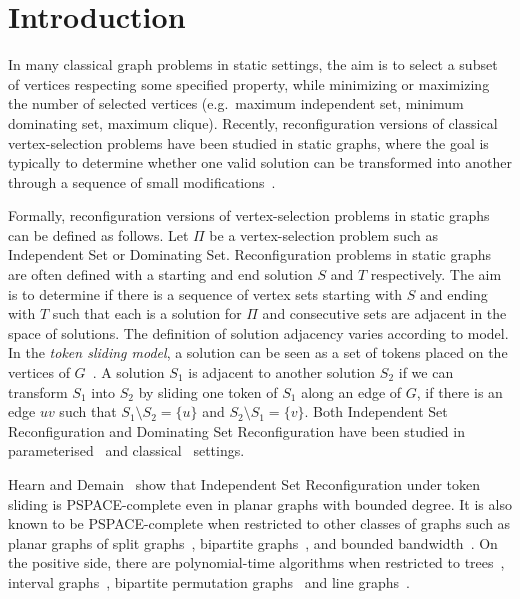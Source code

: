 \section{Introduction}

In many classical graph problems in static settings, the aim is to select a subset of vertices respecting some specified property, while minimizing or maximizing the number of selected vertices (e.g.\ maximum independent set, minimum dominating set, maximum clique).
%
Recently, reconfiguration versions of classical vertex-selection problems have been studied in static graphs, where the goal is typically to determine whether one valid solution can be transformed into another through a sequence of small modifications~\cite{BousquetMNS24,MouawadN0SS17}.

Formally, reconfiguration versions of vertex-selection problems in static graphs can be defined as follows. Let $\Pi$ be a vertex-selection problem such as {\sc Independent Set} or {\sc Dominating Set}. Reconfiguration problems in static graphs are often defined with a starting and end solution $S$ and $T$ respectively. The aim is to determine if there is a sequence of vertex sets starting with $S$ and ending with $T$ such that each is a solution for $\Pi$ and consecutive sets are adjacent in the space of solutions. The definition of solution adjacency varies according to model. In the \emph{token sliding model}, a solution can be seen as a set of tokens placed on the vertices of $G$~\cite{HEARN200572}. A solution $S_1$ is adjacent to another solution $S_2$ if we can transform $S_1$ into $S_2$ by sliding one token of $S_1$ along an edge of $G$, if there is an edge $uv$ such that $S_1 \setminus S_2 = \{u\}$ and $S_2 \setminus S_1 = \{v\}$. Both {\sc Independent Set Reconfiguration} and {\sc Dominating Set Reconfiguration} have been studied in parameterised~\cite{BodlaenderGS21,BartierBDLM21} and classical~\cite{BousquetJO20,SuzukiMN16} settings. 

Hearn and Demain~\cite{HEARN200572} show that {\sc Independent Set Reconfiguration} under token sliding is PSPACE-complete even in planar graphs with bounded degree. It is also known to be PSPACE-complete when restricted to other classes of graphs such as planar graphs of split graphs~\cite{BelmonteKLMOS21}, bipartite graphs~\cite{LokshtanovM19}, and bounded bandwidth~\cite{Wrochna18}. On the positive side, there are polynomial-time algorithms when restricted to trees~\cite{DemaineDFHIOOUY14}, interval graphs~\cite{BonamyB17}, bipartite permutation graphs~\cite{Fox-EpsteinHOU15} and line graphs~\cite{ItoDHPSUU11}. 

